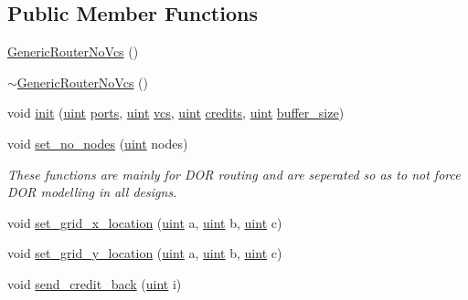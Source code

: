 \subsection*{Public Member Functions}
\begin{CompactItemize}
\item 
\hyperlink{classGenericRouterNoVcs_0c9d450ec65aa82e1f82d20b3d7c66e1}{GenericRouterNoVcs} ()
\item 
\hyperlink{classGenericRouterNoVcs_25aa63b54decdffddb9bfd2da7759c4b}{$\sim$GenericRouterNoVcs} ()
\item 
void \hyperlink{classGenericRouterNoVcs_d0abf72a39438d7b23b9b03029d75da2}{init} (\hyperlink{outputBuffer_8h_91ad9478d81a7aaf2593e8d9c3d06a14}{uint} \hyperlink{classRouter_fd8e8adaf03e17b3fdbf7adc758c8f48}{ports}, \hyperlink{outputBuffer_8h_91ad9478d81a7aaf2593e8d9c3d06a14}{uint} \hyperlink{classRouter_ebaf2bc63bd99effe6520f9718120a1e}{vcs}, \hyperlink{outputBuffer_8h_91ad9478d81a7aaf2593e8d9c3d06a14}{uint} \hyperlink{classRouter_d747f5b948a9ef1497de6d4bb97b8f03}{credits}, \hyperlink{outputBuffer_8h_91ad9478d81a7aaf2593e8d9c3d06a14}{uint} \hyperlink{classRouter_b456618374083b8f2ec3c8e889d45bac}{buffer\_\-size})
\item 
void \hyperlink{classGenericRouterNoVcs_877a1b3fac555ef48ad7690429b2be28}{set\_\-no\_\-nodes} (\hyperlink{outputBuffer_8h_91ad9478d81a7aaf2593e8d9c3d06a14}{uint} nodes)
\begin{CompactList}\small\item\em These functions are mainly for DOR routing and are seperated so as to not force DOR modelling in all designs. \item\end{CompactList}\item 
void \hyperlink{classGenericRouterNoVcs_9a0bc9c779518e5564bb25c0a3867434}{set\_\-grid\_\-x\_\-location} (\hyperlink{outputBuffer_8h_91ad9478d81a7aaf2593e8d9c3d06a14}{uint} a, \hyperlink{outputBuffer_8h_91ad9478d81a7aaf2593e8d9c3d06a14}{uint} b, \hyperlink{outputBuffer_8h_91ad9478d81a7aaf2593e8d9c3d06a14}{uint} c)
\item 
void \hyperlink{classGenericRouterNoVcs_30fb743466538fcf9d158ffa665f9ca2}{set\_\-grid\_\-y\_\-location} (\hyperlink{outputBuffer_8h_91ad9478d81a7aaf2593e8d9c3d06a14}{uint} a, \hyperlink{outputBuffer_8h_91ad9478d81a7aaf2593e8d9c3d06a14}{uint} b, \hyperlink{outputBuffer_8h_91ad9478d81a7aaf2593e8d9c3d06a14}{uint} c)
\item 
void \hyperlink{classGenericRouterNoVcs_f8bd205f15bb6ef680e1af859950f3d9}{send\_\-credit\_\-back} (\hyperlink{outputBuffer_8h_91ad9478d81a7aaf2593e8d9c3d06a14}{uint} i)

\end{CompactItemize}
